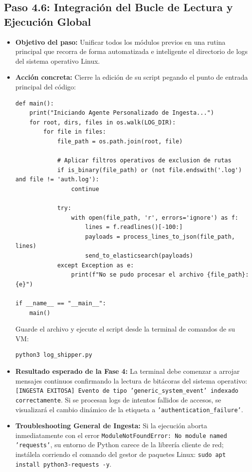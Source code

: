 \documentclass[
  coursetitle={Cómputo Nube y Tecnologías Emergentes},
  coursehours={96},
  coursedate={Verano 2026},
  doctype={Guía de Laboratorio Práctico},
  otherlangs={english,french},
  authorname={Lázaro},
  authorsurname={Bustio-Martínez},
  authortitle={PhD},
  role={Profesor Investigador},
  email={lbustio@inaoe.mx},
  phone={5559504000},
  ext={7459},
  institution={Instituto Nacional de Astrofísica, Óptica y Electrónica (INAOE)},
  department={Maestría en Ciencias en Tecnologías de Seguridad},
  address={Luis Enrique Erro 1, Sta. Ma. Tonantzintla, San Andrés Cholula, CP 72840, Puebla, México},
  margin={0.5in}
]{../../lbustio_lecture_notes}
\begin{document}
\subsection{Paso 4.6: Integración del Bucle de Lectura y Ejecución Global}
\begin{itemize}
    \item \textbf{Objetivo del paso:} Unificar todos los módulos previos en una rutina principal que recorra de forma automatizada e inteligente el directorio de logs del sistema operativo Linux.
    \item \textbf{Acción concreta:} Cierre la edición de su script pegando el punto de entrada principal del código:
\begin{verbatim}
def main():
    print("Iniciando Agente Personalizado de Ingesta...")
    for root, dirs, files in os.walk(LOG_DIR):
        for file in files:
            file_path = os.path.join(root, file)
            
            # Aplicar filtros operativos de exclusion de rutas
            if is_binary(file_path) or (not file.endswith('.log') and file != 'auth.log'):
                continue
                
            try:
                with open(file_path, 'r', errors='ignore') as f:
                    lines = f.readlines()[-100:]
                    payloads = process_lines_to_json(file_path, lines)
                    send_to_elasticsearch(payloads)
            except Exception as e:
                print(f"No se pudo procesar el archivo {file_path}: {e}")

if __name__ == "__main__":
    main()
\end{verbatim}
    Guarde el archivo y ejecute el script desde la terminal de comandos de su VM:
\begin{verbatim}
python3 log_shipper.py
\end{verbatim}
    \item \textbf{Resultado esperado de la Fase 4:} La terminal debe comenzar a arrojar mensajes continuos confirmando la lectura de bitácoras del sistema operativo: \texttt{[INGESTA EXITOSA] Evento de tipo 'generic\_system\_event' indexado correctamente}. Si se procesan logs de intentos fallidos de accesos, se visualizará el cambio dinámico de la etiqueta a \texttt{'authentication\_failure'}.
    \item \textbf{Troubleshooting General de Ingesta:} Si la ejecución aborta inmediatamente con el error \texttt{ModuleNotFoundError: No module named 'requests'}, su entorno de Python carece de la librería cliente de red; instálela corriendo el comando del gestor de paquetes Linux: \texttt{sudo apt install python3-requests -y}.
\end{itemize}
\end{document}
